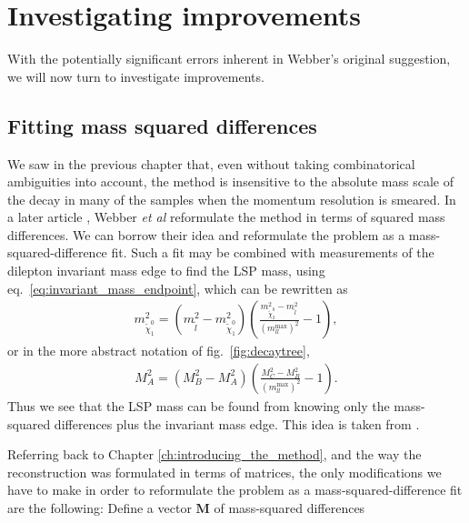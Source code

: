 \documentclass[twoside,english]{uiofysmaster}
\begin{document}
\chapter{Investigating improvements}%
With the potentially significant errors inherent in Webber's original suggestion, we will now turn to investigate improvements.


\section{Fitting mass squared differences}
We saw in the previous chapter that, even without taking combinatorical ambiguities into account, the method is insensitive to the absolute mass scale of the decay in many of the samples when the momentum resolution is smeared. In a later article \cite{Nojiri:2010dk}, Webber {\it et al} reformulate the method in terms of squared mass differences. We can borrow their idea and reformulate the problem as a mass-squared-difference fit. Such a fit may be combined with measurements of the dilepton invariant mass edge to find the LSP mass, using eq.\ \eqref{eq:invariant_mass_endpoint}, which can be rewritten as
\begin{align}
	m^2_{\tilde\chi_1^0} = (m^2_{\tilde l} - m^2_{\tilde \chi_1^0})\left(\frac{m^2_{\tilde\chi_2^0} - m^2_{\tilde l}}{(m_{ll}^\mathrm{max})^2} - 1\right),
\end{align}
or in the more abstract notation of fig.\ \ref{fig:decaytree},
\begin{align}
	M^2_A = (M^2_B - M^2_A)\left(\frac{M^2_C - M^2_B}{(m_{ll}^\mathrm{max})^2} - 1\right).\label{eq:MLSP_dilepton_edge}
\end{align}
Thus we see that the LSP mass can be found from knowing only the mass-squared differences plus the invariant mass edge. This idea is taken from \cite{Cheng:2009fw}.

Referring back to Chapter \ref{ch:introducing_the_method}, and the way the reconstruction was formulated in terms of matrices, the only modifications we have to make in order to reformulate the problem as a mass-squared-difference fit are the following: Define a vector $\mathbf{M}$ of mass-squared differences
\end{document}
